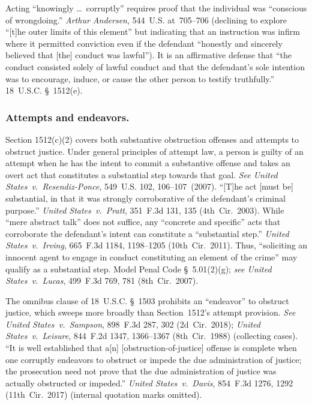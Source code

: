 Acting ``knowingly \dots\ corruptly'' requires proof that the individual was ``conscious of wrongdoing.''
\textit{Arthur Andersen}, 544~U.S. at~705--706 (declining to explore ``[t]he outer limits of this element'' but indicating that an instruction was infirm where it permitted conviction even if the defendant ``honestly and sincerely believed that [the] conduct was lawful'').
It is an affirmative defense that ``the conduct consisted solely of lawful conduct and that the defendant's sole intention was to encourage, induce, or cause the other person to testify truthfully.''
18~U.S.C. \S~1512(e).

\subsubsection*{Attempts and endeavors.}

Section 1512(c)(2) covers both substantive obstruction offenses and attempts to obstruct justice. Under general principles of attempt law, a person is guilty of an attempt when he has the intent to commit a substantive offense and takes an overt act that constitutes a substantial step towards that goal.
\textit{See United States~v.\ Resendiz-Ponce}, 549~U.S. 102, 106--107~(2007).
``[T]he act [must be] substantial, in that it was strongly corroborative of the defendant's criminal purpose.''
\textit{United States~v.\ Pratt}, 351~F.3d 131, 135 (4th~Cir.~2003).
While ``mere abstract talk'' does not suffice, any ``concrete and specific'' acts that corroborate the defendant's intent can constitute a ``substantial step.''
\textit{United States~v.\ Irving}, 665~F.3d 1184, 1198--1205 (10th~Cir.~2011).
Thus, ``soliciting an innocent agent to engage in conduct constituting an element of the crime'' may qualify as a substantial step.
Model Penal Code \S~5.01(2)(g);
\textit{see United States~v.\ Lucas}, 499~F.3d 769, 781 (8th~Cir.~2007).

The omnibus clause of 18~U.S.C. \S~1503 prohibits an ``endeavor'' to obstruct justice, which sweeps more broadly than Section~1512's attempt provision.
\textit{See United States~v.\ Sampson}, 898~F.3d 287, 302 (2d~Cir.~2018);
\textit{United States~v.\ Leisure}, 844~F.2d 1347, 1366--1367 (8th~Cir.~1988) (collecting cases).
``It is well established that a[n] [obstruction-of-justice] offense is complete when one corruptly endeavors to obstruct or impede the due administration of justice;
the prosecution need not prove that the due administration of justice was actually obstructed or impeded.''
\textit{United States~v.\ Davis}, 854~F.3d 1276, 1292 (11th~Cir.~2017) (internal quotation marks omitted).

